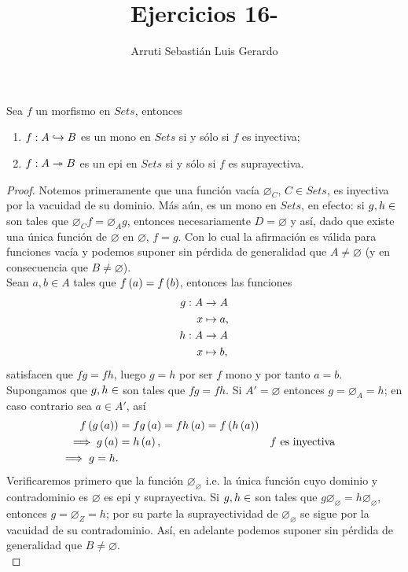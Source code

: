 \documentclass{article}
\title{Ejercicios 16-}
\author{Arruti Sebastián Luis Gerardo}
\begin{document}
	\begin{lem}
		Sea $f$ un morfismo en $Sets$, entonces
		\begin{enumerate}[label=$\alph*)$]
			\item $\catarrow{f}{A}{B}{m}$ es un mono en $Sets$ si y sólo si $f$ es inyectiva;
			\item $\catarrow{f}{A}{B}{e}$ es un epi en $Sets$ si y sólo si $f$ es suprayectiva.
		\end{enumerate}
		\begin{proof}
			 Notemos primeramente que una función vacía $\varnothing_C$, $C\in Sets$, es inyectiva por la vacuidad de su dominio. Más aún, es un mono en $Sets$, en efecto: si $g,h\in\ringmod{Sets}{D}{\varnothing}$ son tales que $\varnothing_C f=\varnothing_A g$, entonces necesariamente $D=\varnothing$ y así, dado que existe una única función de $\varnothing$ en $\varnothing$, $f=g$. Con lo cual la afirmación es válida para funciones vacía y podemos suponer sin pérdida de generalidad que $A\neq\varnothing$ (y en consecuencia que $B\neq\varnothing$).\\
			 Sean $a,b\in A$ tales que $f\left(a\right)=f\left(b\right)$, entonces las funciones
			\begin{align*}
				g: A &\rightarrow A\\ x &\mapsto a,\\
				h: A &\rightarrow A\\ x &\mapsto b,
			\end{align*}
			satisfacen que $fg=fh$, luego $g=h$ por  ser $f$ mono y por tanto $a=b$.\\
			 Supongamos que  $g,h\in\ringmod{Sets}{A'}{A}$ son tales que $fg=fh$. Si $A'=\varnothing$ entonces $g=\varnothing_A=h$; en caso contrario sea $a\in A'$, así
			\begin{align*}
				f\left(g\left(a\right)\right)&=fg\left(a\right)=fh\left(a\right)=f\left(h\left(a\right)\right)\\
				\implies g\left(a\right)&=h\left(a\right), && f\text{ es inyectiva}\\
				\implies g=h.
			\end{align*}
			 Verificaremos primero que la función $\varnothing_\varnothing$ i.e. la única función cuyo dominio y contradominio es $\varnothing$ es epi y suprayectiva. Si  $g,h\in\ringmod{Sets}{\varnothing}{Z}$ son tales que $g\varnothing_\varnothing=h\varnothing_\varnothing$, entonces $g=\varnothing_Z=h$; por su parte la suprayectividad de $\varnothing_\varnothing$ se sigue por la vacuidad de su contradominio. Así, en adelante podemos suponer sin pérdida de generalidad que $B\neq\varnothing$.\\

\end{proof}
\end{lem}
\end{document}
